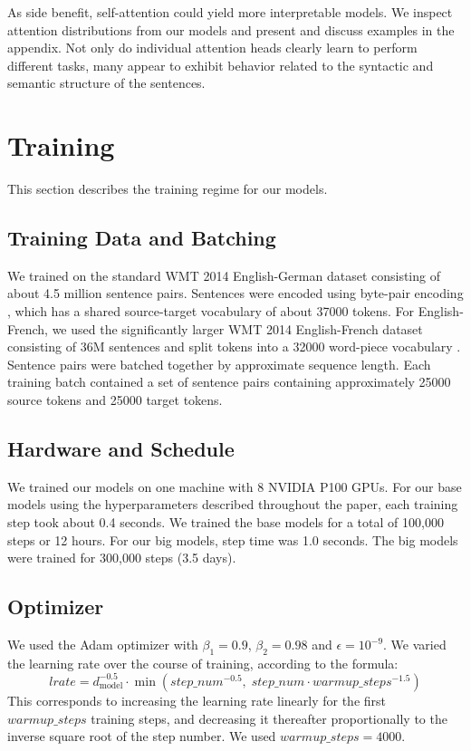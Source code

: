 As side benefit, self-attention could yield more interpretable models. We
inspect attention distributions from our models and present and discuss examples
in the appendix. Not only do individual attention heads clearly learn to perform
different tasks, many appear to exhibit behavior related to the syntactic and
semantic structure of the sentences.

\section{Training}

This section describes the training regime for our models.

\subsection{Training Data and Batching}

We trained on the standard WMT 2014 English-German dataset consisting of about
4.5 million sentence pairs. Sentences were encoded using byte-pair encoding
\cite{sennrich2015neural}, which has a shared source-target vocabulary of about
37000 tokens. For English-French, we used the significantly larger WMT 2014
English-French dataset consisting of 36M sentences and split tokens into a
32000 word-piece vocabulary \cite{wu2016google}. Sentence pairs were batched
together by approximate sequence length. Each training batch contained a set of
sentence pairs containing approximately 25000 source tokens and 25000 target
tokens.

\subsection{Hardware and Schedule}

We trained our models on one machine with 8 NVIDIA P100 GPUs. For our base
models using the hyperparameters described throughout the paper, each training
step took about 0.4 seconds. We trained the base models for a total of 100,000
steps or 12 hours. For our big models, step time was 1.0 seconds. The big
models were trained for 300,000 steps (3.5 days).

\subsection{Optimizer}

We used the Adam optimizer \cite{kingma2014adam} with $\beta_1 = 0.9$,
$\beta_2 = 0.98$ and $\epsilon = 10^{-9}$. We varied the learning rate over the
course of training, according to the formula:
\[
  lrate = d_{\text{model}}^{-0.5} \cdot
  \min\!\left(step\_num^{-0.5},\;
  step\_num \cdot warmup\_steps^{-1.5}\right)
\]
This corresponds to increasing the learning rate linearly for the first
$warmup\_steps$ training steps, and decreasing it thereafter proportionally to
the inverse square root of the step number. We used $warmup\_steps = 4000$.


